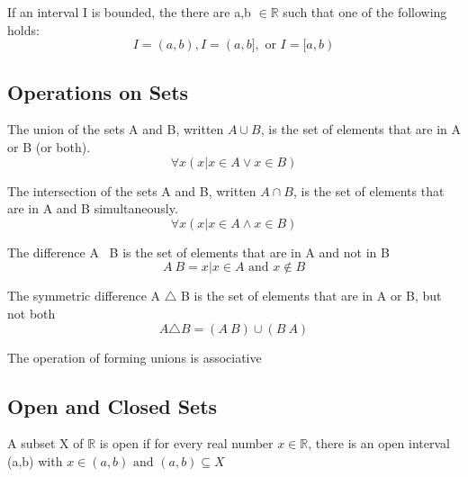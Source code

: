 \documentclass{article}
\begin{document}
\begin{theorem}
    If an interval I is bounded, the there are a,b $\in \mathbb{R} $ such that
    one of the following holds:
    $$ I=(a,b), I=(a,b], \text{ or } I=[a,b) $$
\end{theorem}

\subsection{Operations on Sets}

\begin{definition}[Union]
    The union of the sets A and B, written \(A \cup B\), is the set of elements that
    are in A or B (or both).
    $$ \forall x(x | x \in A \lor x \in B) $$
\end{definition}

\begin{definition}[Intersection]
    The intersection of the sets A and B, written \(A \cap B\), is the set of
    elements that are in A and B simultaneously.
    $$ \forall x(x | x \in A \land x \in B) $$
\end{definition}

\begin{definition}[Difference]
    The difference A \ B is the set of elements that are in A and not in B
    $$ A \ B = {x|x \in A \text{ and } x \notin B} $$
\end{definition}

\begin{definition}
    The symmetric difference A $ \triangle $ B is the set of elements that are
    in A or B, but not both
    $$ A \triangle B = (A \ B) \cup (B \ A) $$
\end{definition}

\begin{theorem}
    The operation of forming unions is associative
\end{theorem}

\subsection{Open and Closed Sets}

\begin{definition}
    A subset X of $\mathbb{R}$ is open if for every real number $ x \in \mathbb{R}$,
    there is an open interval (a,b) with $ x \in (a,b) \text{ and } (a,b) \subseteq X$
\end{definition}
\end{document}
